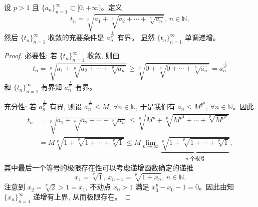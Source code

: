 \documentclass[../../main.tex]{subfiles}
\begin{document}
\begin{theorem}[Herschfeld判别法]\label{theorem:Herschfeld判别法}
设 \( p > 1 \) 且 \( \{a_n\}_{n = 1}^{\infty} \subset [0, +\infty) \)。定义
\[
t_n = \sqrt[p]{a_1 + \sqrt[p]{a_2 + \cdots + \sqrt[p]{a_n}}}, \, n \in \mathbb{N},
\]
然后 \( \{t_n\}_{n = 1}^{\infty} \) 收敛的充要条件是 \( a_n^{\frac{1}{p^n}} \) 有界。
显然 \( \{t_n\}_{n = 1}^{\infty} \) 单调递增。
\end{theorem}
\begin{proof}
{\heiti 必要性:} 若 \( \{t_n\}_{n = 1}^{\infty} \) 收敛, 则由
\[
t_n = \sqrt[p]{a_1 + \sqrt[p]{a_2 + \cdots + \sqrt[p]{a_n}}} \geqslant \sqrt[p]{0 + \sqrt[p]{0 + \cdots + \sqrt[p]{a_n}}} = a_n^{\frac{1}{p^n}}
\]
和 \( \{t_n\}_{n = 1}^{\infty} \) 有界知 \( a_n^{\frac{1}{p^n}} \) 有界。

{\heiti 充分性:} 若 \( a_n^{\frac{1}{p^n}} \) 有界, 则设 \( a_n^{\frac{1}{p^n}} \leqslant M, \, \forall n \in \mathbb{N} \), 于是我们有 \( a_n \leqslant M^{p^n}, \, \forall n \in \mathbb{N} \)。因此
\begin{align*}
t_n &= \sqrt[p]{a_1 + \sqrt[p]{a_2 + \cdots + \sqrt[p]{a_n}}} \leqslant \sqrt[p]{M^{p} + \sqrt[p]{M^{p^2} + \cdots + \sqrt[p]{M^{p^n}}}} \\
&= M\sqrt[p]{1 + \sqrt[p]{1 + \cdots + \sqrt[p]{1}}} \leqslant M \lim_{n \to \infty} \underbrace{\sqrt[p]{1 + \sqrt[p]{1 + \cdots + \sqrt[p]{1}}}}_{n \text{ 个根号}},
\end{align*}
其中最后一个等号的极限存在性可以考虑递增函数确定的递推
\[
x_1 = \sqrt[p]{1}, \, x_{n + 1} = \sqrt[p]{1 + x_n}, \, n \in \mathbb{N}.
\]
注意到 \( x_2 = \sqrt[p]{2} > 1 = x_1 \), 不动点 \( x_0 > 1 \) 满足 \( x_0^p - x_0 - 1 = 0 \)。因此由知 \( \{x_n\}_{n = 1}^{\infty} \) 递增有上界, 从而极限存在。
\end{proof}
\end{document}
